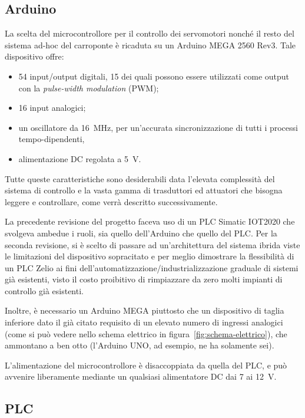 \subsection{Arduino}

La scelta del microcontrollore per il controllo dei servomotori nonché il resto del sistema ad-hoc
del carroponte è ricaduta su un Arduino MEGA 2560 Rev3. Tale dispositivo offre:
\begin{itemize}
    \item 54 input/output digitali, 15 dei quali possono essere utilizzati come output con la
        \emph{pulse-width modulation} (PWM);
    \item 16 input analogici;
    \item un oscillatore da \qty{16}{\mega\hertz}, per un'accurata sincronizzazione di tutti i
        processi tempo-dipendenti,
    \item alimentazione DC regolata a \qty{5}{\volt}.
\end{itemize}
Tutte queste caratteristiche sono desiderabili data l'elevata complessità del sistema di controllo e
la vasta gamma di trasduttori ed attuatori che bisogna leggere e controllare, come verrà descritto
successivamente.

La precedente revisione del progetto faceva uso di un PLC Simatic IOT2020 che svolgeva ambedue i
ruoli, sia quello dell'Arduino che quello del PLC. Per la seconda revisione, si è scelto di passare
ad un'architettura del sistema ibrida viste le limitazioni del dispositivo sopracitato e per meglio
dimostrare la flessibilità di un PLC Zelio ai fini dell'automatizzazione/industrializzazione
graduale di sistemi già esistenti, visto il costo proibitivo di rimpiazzare da zero molti impianti
di controllo già esistenti.

Inoltre, è necessario un Arduino MEGA piuttosto che un dispositivo di taglia inferiore dato il già
citato requisito di un elevato numero di ingressi analogici (come si può vedere nello schema
elettrico in figura~\ref{fig:schema-elettrico}), che ammontano a ben otto (l'Arduino UNO, ad
esempio, ne ha solamente sei).

L'alimentazione del microcontrollore è disaccoppiata da quella del PLC, e può avvenire liberamente
mediante un qualsiasi alimentatore DC dai \num{7} ai \qty{12}{\volt}.

\subsection{PLC}

